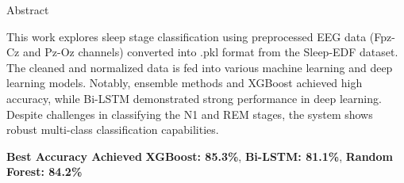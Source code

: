 \begin{frame}{Abstract}


		This work explores sleep stage classification using preprocessed EEG data (Fpz-Cz and Pz-Oz channels) converted into .pkl format from the Sleep-EDF dataset. The cleaned and normalized data is fed into various machine learning and deep learning models. Notably, ensemble methods and XGBoost achieved high accuracy, while Bi-LSTM demonstrated strong performance in deep learning. Despite challenges in classifying the N1 and REM stages, the system shows robust multi-class classification capabilities.
		
		\begin{block}{\textbf{Best Accuracy Achieved}}
			\textbf{XGBoost: 85.3\%}, \textbf{Bi-LSTM: 81.1\%}, \textbf{Random Forest: 84.2\%}  
		\end{block}


\end{frame}
